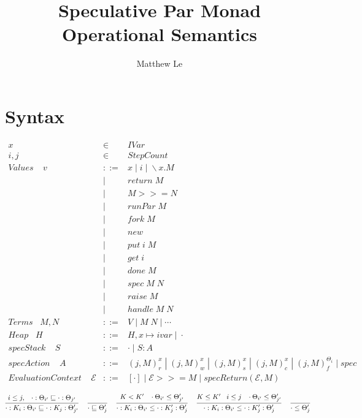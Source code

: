 \documentclass[9pt]{article}
\title{Speculative Par Monad Operational Semantics}
\author{Matthew Le}
\begin{document}
\maketitle

\section{Syntax}

\begin{displaymath}
\begin{array}{rcll}
x &\in& IVar \\
i, j &\in& StepCount  \\ 

Values \;\;\;\; v & ::= & x \; | \; i \; | \; \backslash x. M \\
& | & return \; M\\ 
& | & M >>= N\\
& | & runPar \; M \\
& | & fork \; M \\
& | & new \\
& | & put \; i \; M \\
& | & get \; i \\ 
& | & done \; M \\
& | & spec \; M \; N \\
& | & raise \; M \\
& | & handle \; M \; N  \\


Terms \;\;\; M, N &::=&  V \;| \;M \; N \; | \; \cdots\\

Heap \;\;\; H &::=& H, x \mapsto ivar \; | \; \cdot \\

specStack \;\;\;\; S &::=& \cdot \; | \; S : A\; \\
specAction \;\;\;\; A &::=& (j, M)_r^x \; | \; (j, M)_w^x \; | \; (j, M)_s^x \; | \; (j, M)_c^x \; | \; (j, M)_f^{\Theta_i} \; | \; spec\\

Evaluation Context \;\;\;\; \mathcal{E} &::=& [\cdot] \; | \; \mathcal{E} >>= M \; | \; specReturn(\mathcal{E}, M) 
\end{array}
\end{displaymath}

\[
\infer[]{\cdot : K_i : \Theta_{i'} \sqsubseteq \cdot : K_j : \Theta_{j'}'}{i \le j, \;\;\; \cdot : \Theta_{i'} \sqsubseteq \cdot : \Theta_{j'}} \;\;\;
\infer[]{\cdot \sqsubseteq \Theta_j' }{} \;\;\;
\infer[]{\cdot : K_i : \Theta_{i'} \le \cdot : K'_j : \Theta_j'}{K < K' \;\;\; \cdot \Theta_{i'} \le \Theta_{j'}'} \;\;\;
\infer[]{\cdot : K_i : \Theta_{i'} \le \cdot : K'_j : \Theta_j'}{K \le K' \;\;\; i \le j \;\;\; \cdot \Theta_{i'} \le \Theta_{j'}'} \;\;\;
\infer[]{\cdot \le \Theta_j'}{}
\]
\end{document}
